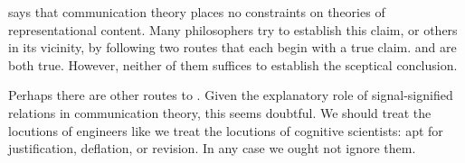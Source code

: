 \documentclass[12pt]{article}
\begin{document}
\tic{} says that communication theory places no constraints on theories of representational content.
Many philosophers try to establish this claim, or others in its vicinity, by following two routes that each begin with a true claim.
\sw{} and \ami{} are both true.
However, neither of them suffices to establish the sceptical conclusion.

Perhaps there are other routes to \tic{}.
Given the explanatory role of signal-signified relations in communication theory, this seems doubtful.
We should treat the locutions of engineers like we treat the locutions of cognitive scientists: apt for justification, deflation, or revision.
In any case we ought not ignore them.



\printbibliography
\end{document}
